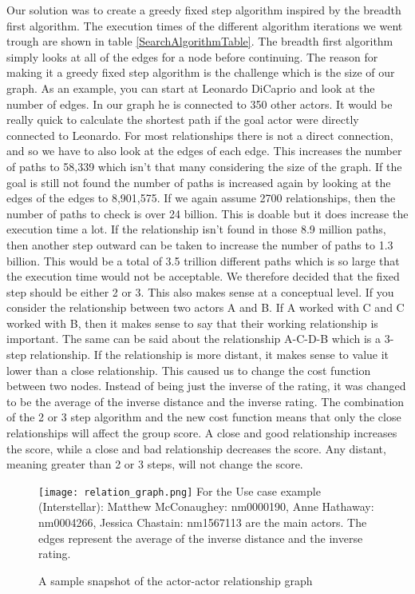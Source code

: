 Our solution was to create a greedy fixed step algorithm inspired by the breadth first algorithm. The execution times of the different algorithm iterations we went trough are shown in table \ref{SearchAlgorithmTable}. The breadth first algorithm simply looks at all of the edges for a node before continuing. The reason for making it a greedy fixed step algorithm is the challenge which is the size of our graph. As an example, you can start at Leonardo DiCaprio and look at the number of edges. In our graph he is connected to 350 other actors. It would be really quick to calculate the shortest path if the goal actor were directly connected to Leonardo. For most relationships there is not a direct connection, and so we have to also look at the edges of each edge. This increases the number of paths to 58,339 which isn’t that many considering the size of the graph. If the goal is still not found the number of paths is increased again by looking at the edges of the edges to 8,901,575. If we again assume 2700 relationships, then the number of paths to check is over 24 billion. This is doable but it does increase the execution time a lot. If the relationship isn’t found in those 8.9 million paths, then another step outward can be taken to increase the number of paths to 1.3 billion. This would be a total of 3.5 trillion different paths which is so large that the execution time would not be acceptable. We therefore decided that the fixed step should be either 2 or 3. This also makes sense at a conceptual level. If you consider the relationship between two actors A and B. If A worked with C and C worked with B, then it makes sense to say that their working relationship is important. The same can be said about the relationship A-C-D-B which is a 3-step relationship. If the relationship is more distant, it makes sense to value it lower than a close relationship. This caused us to change the cost function between two nodes. Instead of being just the inverse of the rating, it was changed to be the average of the inverse distance and the inverse rating. The combination of the 2 or 3 step algorithm and the new cost function means that only the close relationships will affect the group score. A close and good relationship increases the score, while a close and bad relationship decreases the score. Any distant, meaning greater than 2 or 3 steps, will not change the score.



\begin{figure}[t]
    \centering
    \texttt{[image: relation\_graph.png]}
    \justifying
    \small
    For the Use case example (Interstellar): Matthew McConaughey: nm0000190, Anne Hathaway: nm0004266, Jessica Chastain: nm1567113 are the main actors. The edges represent the average of the inverse distance and the inverse rating.
    \caption{A sample snapshot of the actor-actor relationship graph}
    \label{fig: relation graph}
\end{figure}



